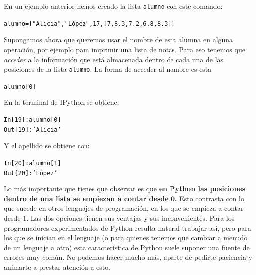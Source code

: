 \documentclass[10pt,a4paper]{article}\usepackage[]{graphicx}\usepackage[]{color}
\makeatletter
\newcommand{\hlnum}[1]{\textcolor[rgb]{0.686,0.059,0.569}{#1}}%
\newcommand{\hlstr}[1]{\textcolor[rgb]{0.192,0.494,0.8}{#1}}%
\newcommand{\hlopt}[1]{\textcolor[rgb]{0,0,0}{#1}}%
\newcommand{\hlstd}[1]{\textcolor[rgb]{0.345,0.345,0.345}{#1}}%
\newenvironment{kframe}{%
 \def\at@end@of@kframe{}%
 \ifinner\ifhmode%
  \def\at@end@of@kframe{\end{minipage}}%
  \begin{minipage}{\columnwidth}%
 \fi\fi%
 \def\FrameCommand##1{\hskip\@totalleftmargin \hskip-\fboxsep
 \colorbox{shadecolor}{##1}\hskip-\fboxsep
     \hskip-\linewidth \hskip-\@totalleftmargin \hskip\columnwidth}%
 \MakeFramed {\advance\hsize-\width
   \@totalleftmargin\z@ \linewidth\hsize
   \@setminipage}}%
 {\par\unskip\endMakeFramed%
 \at@end@of@kframe}
\newenvironment{knitrout}{}{} %
\newcounter {cont01}
\makeatother
\begin{document}
En un ejemplo anterior hemos creado la lista {\tt alumno} con este comando:
\begin{knitrout}
\color{fgcolor}\begin{kframe}
\begin{alltt}
alumno = [\hlstr{"Alicia"}, \hlstr{"López"}, 17, [7, 8.3, 7.2, 6.8, 8.3]]
\end{alltt}
\end{kframe}
\end{knitrout}
Supongamos ahora que queremos usar el nombre de esta alumna en alguna operación, por ejemplo para imprimir una lista de notas. Para eso tenemos que {\em acceder} a la información que está almacenada dentro de cada una de las posiciones de la lista {\tt alumno}. La forma de acceder al nombre es esta
\begin{knitrout}
\color{fgcolor}\begin{kframe}
\begin{alltt}
\hlstd{alumno[}\hlnum{0}\hlstd{]}
\end{alltt}
\end{kframe}
\end{knitrout}
En la terminal de IPython se obtiene:
\begin{knitrout}
\color{fgcolor}\begin{kframe}
\begin{alltt}
\hlstd{In [}\hlnum{19}\hlstd{]}\hlopt{:} \hlstd{alumno[}\hlnum{0}\hlstd{]}
\hlstd{Out[}\hlnum{19}\hlstd{]}\hlopt{:} \hlstr{'Alicia'}
\end{alltt}
\end{kframe}
\end{knitrout}
Y el apellido se obtiene con:
\begin{knitrout}
\color{fgcolor}\begin{kframe}
\begin{alltt}
\hlstd{In [}\hlnum{20}\hlstd{]}\hlopt{:} \hlstd{alumno[}\hlnum{1}\hlstd{]}
\hlstd{Out[}\hlnum{20}\hlstd{]}\hlopt{:} \hlstr{'López'}
\end{alltt}
\end{kframe}
\end{knitrout}
Lo más importante que tienes que observar es que {\bf en Python las posiciones dentro de una lista se empiezan a contar desde $\mathbf 0$.} Esto contrasta con lo que sucede en otros lenguajes de programación, en los que se empieza a contar desde $1$. Las dos opciones tienen sus ventajas y sus inconvenientes. Para los programadores experimentados de Python resulta natural trabajar así, pero para los que se inician en el lenguaje (o para quienes tenemos que cambiar a menudo de un lenguaje a otro) esta característica de Python suele suponer una fuente de errores muy común. No podemos hacer mucho más, aparte de pedirte paciencia y animarte a prestar atención a esto.
\end{document}
